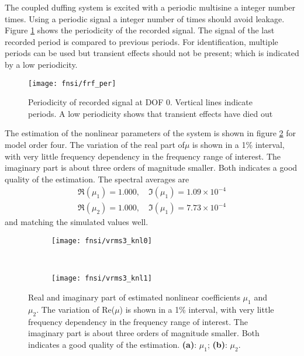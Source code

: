 The coupled duffing system is excited with a periodic multisine a integer
number times. Using a periodic signal a integer number of times should avoid
leakage\autocite{ewins2000a}.
Figure \ref{fig:periodicity} shows the periodicity of the recorded signal. The
signal of the last recorded period is compared to previous periods. For
identification, multiple periods can be used but transient effects should not be
present; which is indicated by a low periodicity.

\begin{figure}[!ht]
  \centering
  \texttt{[image: fnsi/frf\_per]}
  \caption{Periodicity of recorded signal at DOF 0. Vertical lines indicate
    periods. A low periodicity shows that transient effects have died out}
  \label{fig:periodicity}
\end{figure}


The estimation of the nonlinear parameters of the system is shown in figure
\ref{fig:fnsi_knl} for model order four. The variation of the real part of$\mu$
is shown in a 1\% interval, with very little frequency dependency in the
frequency range of interest. The imaginary part is about three orders of
magnitude smaller. Both indicates a good quality of the estimation. The spectral
averages are
\begin{equation}
  \begin{aligned}
    \Re (\mu_1) = 1.000, \quad \Im (\mu_1) = 1.09 \times 10^{-4} \\
    \Re (\mu_2) = 1.000, \quad \Im (\mu_1) = 7.73 \times 10^{-4}
  \end{aligned}
\end{equation}
and matching the simulated values well.

\begin{figure}[!ht]
  \centering
  \begin{subfigure}[b]{0.45\textwidth}
    \texttt{[image: fnsi/vrms3\_knl0]}
    \caption{}
  \end{subfigure}
  ~
  \begin{subfigure}[b]{0.45\textwidth}
    \texttt{[image: fnsi/vrms3\_knl1]}
    \caption{}
  \end{subfigure}
  \caption{Real and imaginary part of estimated nonlinear coefficients $\mu_1$
    and $\mu_2$. The variation of Re($\mu$) is shown in a 1\% interval, with
    very little frequency dependency in the frequency range of interest.
    The imaginary part is about three orders of magnitude smaller. Both
    indicates a good quality of the estimation.
    \textbf{(a)}: $\mu_1$;
    \textbf{(b)}: $\mu_2$.
  }
  \label{fig:fnsi_knl}
\end{figure}

